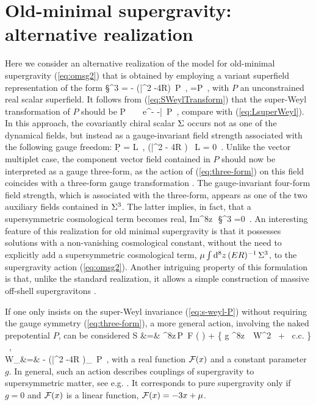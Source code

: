 \chapter{Old-minimal supergravity: alternative realization}
\label{app:alt_sugra}
Here we consider an alternative realization of the model for old-minimal supergravity  (\ref{eq:omsg2}) that is obtained by employing a variant superfield representation \cite{Gates:1980az,Gates:1980ay} of the form
\be
\S^3 = - ({\bar \cD}^2 -4R) \,P~,
 =P~, 
\ee
with $P$ an unconstrained real scalar superfield. It follows from (\ref{eq:SWeylTransform}) that the super-Weyl transformation of $P$ should be 
\be
\label{eq:s-weyl-P}
P ~ \to ~  {\rm e}^{- \s -{\bar \s} } \,P~,
\ee
compare with (\ref{eq:LsuperWeyl}). In this approach, the covariantly chiral scalar  $\S$ occurs not as one of the dynamical fields, but instead as a gauge-invariant field strength associated with  the following gauge freedom:
\be 
\label{eq:three-form}
\d P = L~, \qquad 
({\bar \cD}^2 - 4R ) \, L = 0~. 
\ee 
Unlike the vector multiplet case, the component vector field contained in $P$ should now be interpreted as a gauge three-form, as the action of  (\ref{eq:three-form}) on this field coincides with a three-form gauge transformation \cite{Gates:1980az,Gates:1980ay}. The gauge-invariant four-form field strength, which is associated with the three-form, appears as one of the two auxiliary fields contained in $\S^3$. The latter  implies, in fact,  that a supersymmetric cosmological term \cite{Das:1978nr,Kaku:1978nz,Kaku:1978ea,Siegel:1978nn,Siegel:1978mj} becomes real, 
\be
{\rm Im}{\int\!^8z}\, {}\,\S^3 =0~.
\ee
An interesting feature of this realization for old minimal supergravity is that it possesses solutions with a non-vanishing cosmological constant, without the need to explicitly add a supersymmetric cosmological term, $\m \int {\rm d}^8 z \,(ER)^{-1}\, \S^3$, to the supergravity action (\ref{eq:omsg2}). Another intriguing property of this formulation is that, unlike the standard realization, it allows a simple construction of massive off-shell supergravitons \cite{Buchbinder:2005je,Gregoire:2004ic}.

If one only  insists on the super-Weyl invariance (\ref{eq:s-weyl-P}) without requiring the gauge symmetry (\ref{eq:three-form}), a more general action, involving the naked prepotential $P$, can be considered 
\bea
\label{eq:mass}
S &=& 
{\int\!^8z}\,P\,
{\cal F} \Big(  \Big)
+ \Big\{ g {\int\!^8z}\, {}\,
W^2 ~+~ {\rm c.c.} \Big\} ~, \\
W_\a&=& - ({\bar \cD}^2 -4R )\cD_\a \, \ln P~,
\non
\eea
with a real function ${\cal F}(x)$ and  a constant parameter $g$. In general, such an action describes couplings of supergravity to supersymmetric matter, see e.g. \cite{deWit:1978ww}. It  corresponds to pure supergravity only if  $g=0$ and ${\cal F}(x)$ is a linear function, ${\cal F}(x) = -3x +\m$.
